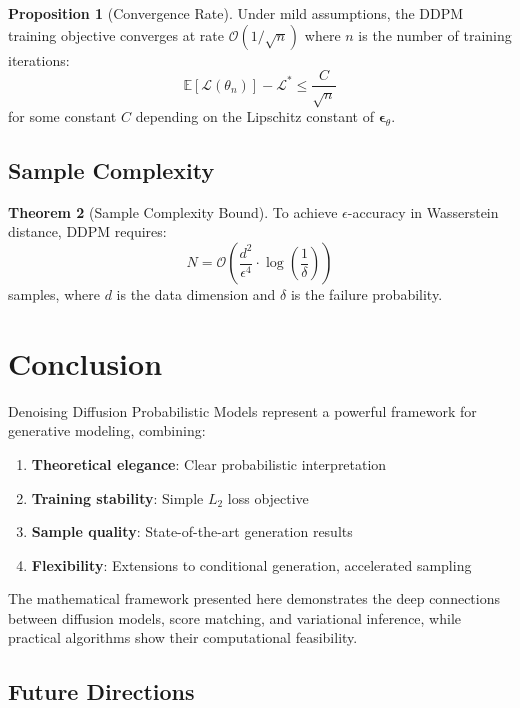 \documentclass[11pt,a4paper]{article}
\theoremstyle{definition}
\newtheorem{theorem}{Theorem}[section]
\newtheorem{proposition}[theorem]{Proposition}
\newcommand{\E}{\mathbb{E}}
\begin{document}
\begin{proposition}[Convergence Rate]
Under mild assumptions, the DDPM training objective converges at rate $\mathcal{O}(1/\sqrt{n})$ where $n$ is the number of training iterations:
\begin{equation}
    \E[\mathcal{L}(\theta_n)] - \mathcal{L}^* \leq \frac{C}{\sqrt{n}}
\end{equation}
for some constant $C$ depending on the Lipschitz constant of $\bm{\epsilon}_\theta$.
\end{proposition}

\subsection{Sample Complexity}

\begin{theorem}[Sample Complexity Bound]
To achieve $\epsilon$-accuracy in Wasserstein distance, DDPM requires:
\begin{equation}
    N = \mathcal{O}\left(\frac{d^2}{\epsilon^4} \cdot \log\left(\frac{1}{\delta}\right)\right)
\end{equation}
samples, where $d$ is the data dimension and $\delta$ is the failure probability.
\end{theorem}

\section{Conclusion}

Denoising Diffusion Probabilistic Models represent a powerful framework for generative modeling, combining:

\begin{enumerate}
    \item \textbf{Theoretical elegance}: Clear probabilistic interpretation
    \item \textbf{Training stability}: Simple $L_2$ loss objective
    \item \textbf{Sample quality}: State-of-the-art generation results
    \item \textbf{Flexibility}: Extensions to conditional generation, accelerated sampling
\end{enumerate}

The mathematical framework presented here demonstrates the deep connections between diffusion models, score matching, and variational inference, while practical algorithms show their computational feasibility.

\subsection{Future Directions}
\end{document}
